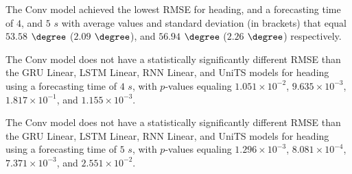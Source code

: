 \begin{table}[!ht]
	\centering
	\caption{The average RMSE in $\degree$, with standard deviation in brackets, across $k$-fold validation datasets for the heading estimated on the $k$-fold testing datasets by different RNN models, and forecasting times.}
	\label{tab:best_direction_RMSE}
\end{table}

The Conv model achieved the lowest RMSE for heading, and a forecasting time of $4$, and $5$ $s$ with average values and standard deviation (in brackets) that equal $53.58$ $\degree$ ($2.09$ $\degree$), and $56.94$ $\degree$ ($2.26$ $\degree$) respectively.

The Conv model does not have a statistically significantly different RMSE than the GRU Linear, LSTM Linear, RNN Linear, and UniTS models for heading using a forecasting time of $4$ $s$, with $p$-values equaling $1.051 \times 10^{-2}$, $9.635 \times 10^{-3}$, $1.817 \times 10^{-1}$, and $1.155 \times 10^{-3}$.

The Conv model does not have a statistically significantly different RMSE than the GRU Linear, LSTM Linear, RNN Linear, and UniTS models for heading using a forecasting time of $5$ $s$, with $p$-values equaling $1.296 \times 10^{-3}$, $8.081 \times 10^{-4}$, $7.371 \times 10^{-3}$, and $2.551 \times 10^{-2}$.

